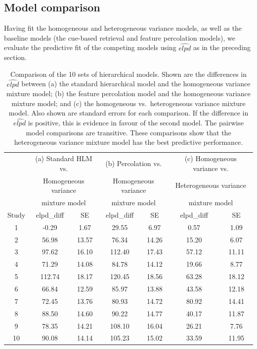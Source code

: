 \documentclass{cambridge7A}\usepackage[]{graphicx}\usepackage[]{color}
\begin{document}
\subsection{Model comparison}
Having fit the homogeneous and heterogeneous variance models, as well as the baseline models (the cue-based retrieval and feature percolation models), we evaluate the predictive fit of the competing models using $\widehat{elpd}$ as in the preceding section.


\begin{table}[!htbp]
\begin{center}
\begin{tabular}{ccccccc}
      & \multicolumn{2}{c}{(a) Standard HLM vs.} & \multicolumn{2}{c}{(b) Percolation vs.} & \multicolumn{2}{c}{(c) Homogeneous variance vs.}\\
      & \multicolumn{2}{c}{Homogeneous variance} & \multicolumn{2}{c}{Homogeneous variance} & \multicolumn{2}{c}{Heterogeneous variance}\\
            & \multicolumn{2}{c}{mixture model} & \multicolumn{2}{c}{mixture model} & \multicolumn{2}{c}{mixture model}\\
Study & elpd\_diff & SE &    elpd\_diff & SE & elpd\_diff & SE \\ 
   1 & -0.29 & 1.67     &    29.55 & 6.97    & 0.57 & 1.09 \\ 
  2 & 56.98 & 13.57     &    76.34 & 14.26   & 15.20 & 6.07 \\ 
   3 & 97.62 & 16.10    &    112.40 & 17.43  & 57.12 & 11.11 \\ 
  4 & 71.29 & 14.08     &    84.78 & 14.12   & 19.66 & 8.77 \\ 
   5 & 112.74 & 18.17   &    120.45 & 18.56  & 63.28 & 18.12 \\ 
  6 & 66.84 & 12.59     &    85.97 & 13.88   & 43.58 & 12.18 \\ 
   7 & 72.45 & 13.76    &    80.93 & 14.72   & 80.92 & 14.41 \\ 
  8 & 88.50 & 14.60     &    90.22 & 14.77   & 40.17 & 11.87 \\ 
  9 & 78.35 & 14.21     &    108.10 & 16.04  & 26.21 & 7.76 \\ 
  10 & 90.08 & 14.14    &   105.23 & 15.02   & 33.59 & 11.95 \\ 
\end{tabular}
\end{center}
\caption{Comparison of the 10 sets of hierarchical models. Shown are the differences in $\widehat{elpd}$ between (a) the standard hierarchical model and the homogeneous variance mixture model; (b) the feature percolation model and the homogeneous variance mixture model; and (c) the homogeneous vs.\ heterogeneous variance mixture model. Also shown are standard errors for each comparison. If the difference in $\widehat{elpd}$ is positive, this is evidence in favour of the second model. The pairwise model comparisons are transitive. These comparisons show that the heterogeneous variance mixture model has the best predictive performance.}\label{tab:allcomparisons}
\end{table}
\end{document}
